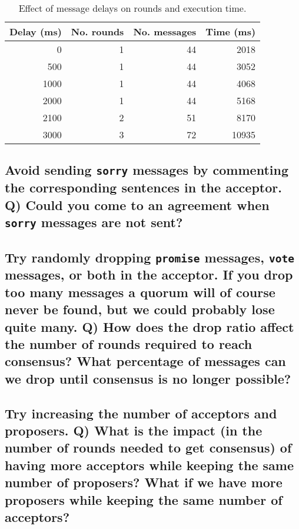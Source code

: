\documentclass[a4paper, 10pt]{article}
\begin{document}
\begin{table}
\centering
\caption{Effect of message delays on rounds and execution time.}
\label{tab:delays}
\begin{tabular}{rrrr}
\toprule
Delay (ms)\! & No. rounds & No. messages & Time (ms)\! \\ \midrule
0            & 1          & 44           & 2018        \\
500          & 1          & 44           & 3052        \\
1000         & 1          & 44           & 4068        \\
2000         & 1          & 44           & 5168        \\
2100         & 2          & 51           & 8170        \\
3000         & 3          & 72           & 10935       \\ \bottomrule
\end{tabular}
\end{table}

\subsection{Avoid sending \texttt{sorry} messages by commenting the corresponding sentences in the acceptor. Q) Could you come to an agreement when \texttt{sorry} messages are not sent?}

\subsection{Try randomly dropping \texttt{promise} messages, \texttt{vote} messages, or both in the acceptor. If you drop too many messages a quorum will of course never be found, but we could probably lose quite many. Q) How does the drop ratio affect the number of rounds required to reach consensus? What percentage of messages can we drop until consensus is no longer possible?}

\subsection{Try increasing the number of acceptors and proposers. Q) What is the impact (in the number of rounds needed to get consensus) of having more acceptors while keeping the same number of proposers? What if we have more proposers while keeping the same number of acceptors?}
\end{document}
